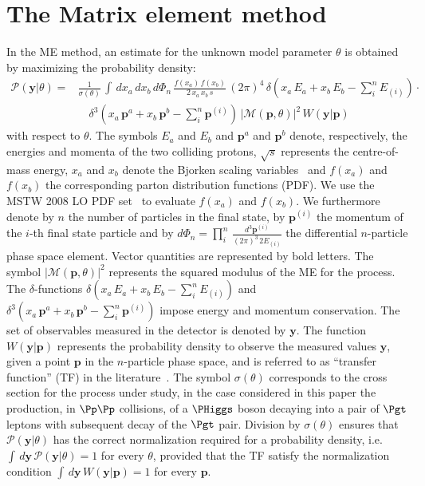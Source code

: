 \section{The Matrix element method}
\label{sec:mem}

In the ME method, an estimate for the unknown model parameter $\theta$
is obtained by maximizing the probability density:
\begin{align}
\mathcal{P}(\bm{y}|\theta) = & \frac{1}{\sigma(\theta)} \, \int \, dx_{a} \, dx_{b} \,
d\Phi_{n} \, \frac{f(x_{a}) \, f(x_{b})}{2 \, x_{a} \, x_{b} \, s} \, (2\pi)^{4} \,
\delta( x_{a} \, E_{a} + x_{b} \, E_{b} - \sum_{i}^{n}
E_{(i)}) \cdot \nonumber \\
 & \quad \delta^{3}( x_{a} \, \bm{p}^{a} + x_{b} \, \bm{p}^{b} - \sum_{i}^{n}
\bm{p}^{(i)}) \, 
  \vert \mathcal{M}(\bm{p},\theta) \vert^{2} \, W(\bm{y}|\bm{p}) 
\label{eq:mem}
\end{align}
with respect to $\theta$.
The symbols $E_{a}$ and $E_{b}$ and $\bm{p}^{a}$ and $\bm{p}^{b}$ denote, respectively, the energies and momenta of the two colliding protons,
$\sqrt{s}$ represents the centre-of-mass energy,
$x_{a}$ and $x_{b}$ denote the Bjorken scaling variables~\cite{Bjorkenx}
and $f(x_{a})$ and $f(x_{b})$ the corresponding parton distribution
functions (PDF).
We use the MSTW 2008 LO PDF set~\cite{MSTW} to evaluate $f(x_{a})$ and $f(x_{b})$.
We furthermore denote by $n$ the number of particles in the final state,
by $\bm{p}^{(i)}$ the momentum of the $i$-th final state particle
and by $d\Phi_{n} = \prod_{i}^{n} \,
\frac{d^{3}\bm{p}^{(i)}}{(2\pi)^{3} \, 2 E_{(i)}}$ the differential $n$-particle
phase space element.
Vector quantities are represented by bold letters.
The symbol $\vert \mathcal{M}(\bm{p},\theta) \vert^{2}$ represents the
squared modulus of the ME for
the process.
The $\delta$-functions $\delta( x_{a} \, E_{a} + x_{b} \, E_{b} - \sum_{i}^{n} E_{(i)})$
and $\delta^{3}( x_{a} \, \bm{p}^{a} + x_{b} \, \bm{p}^{b} - \sum_{i}^{n} \bm{p}^{(i)})$ 
impose energy and momentum conservation.
The set of observables measured in the
detector is denoted by $\bm{y}$.
The function $W(\bm{y}|\bm{p})$ represents the probability density to
observe the measured values $\bm{y}$, given a point $\bm{p}$ in the
$n$-particle phase space, and
is referred to as ``transfer function'' (TF) in the
literature~\cite{Fiedler:2010sg,Volobouev:2011vb}.
The symbol $\sigma(\theta)$ corresponds to the cross section for the process under study,
in the case considered in this paper the production, in $\Pp\Pp$
collisions, of a $\PHiggs$ boson decaying into a pair of $\Pgt$ leptons
with subsequent decay of the $\Pgt$ pair.
Division by $\sigma(\theta)$ ensures that $\mathcal{P}(\bm{y}|\theta)$ has
the correct normalization required for a probability density, 
i.e. $\int \, d\bm{y} \, \mathcal{P}(\bm{y}|\theta) = 1$ for every $\theta$, 
provided that the TF satisfy the normalization condition
$\int \, d\bm{y}\, W(\bm{y}|\bm{p}) = 1$
for every $\bm{p}$.

